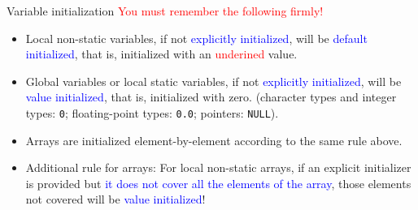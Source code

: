 \documentclass[handout]{beamer}
\newcommand{\red}[1]{\textcolor{red}{#1}}
\newcommand{\blue}[1]{\textcolor{blue}{#1}}
\newcommand{\ttt}[1]{\texttt{#1}}
\begin{document}
\begin{frame}{Variable initialization}
    \red{You must remember the following firmly!}
    \begin{itemize}
        \item Local non-static variables, if not \blue{explicitly initialized}, will be \blue{default initialized}, that is, initialized with an \red{underined} value.
        \item Global variables or local static variables, if not \blue{explicitly initialized}, will be \blue{value initialized}, that is, initialized with zero. (character types and integer types: \ttt{0}; floating-point types: \ttt{0.0}; pointers: \ttt{NULL}).
        \pause
        \item Arrays are initialized element-by-element according to the same rule above.
        \item Additional rule for arrays: For local non-static arrays, if an explicit initializer is provided but \blue{it does not cover all the elements of the array}, those elements not covered will be \blue{value initialized}!
    \end{itemize}
\end{frame}
\end{document}

